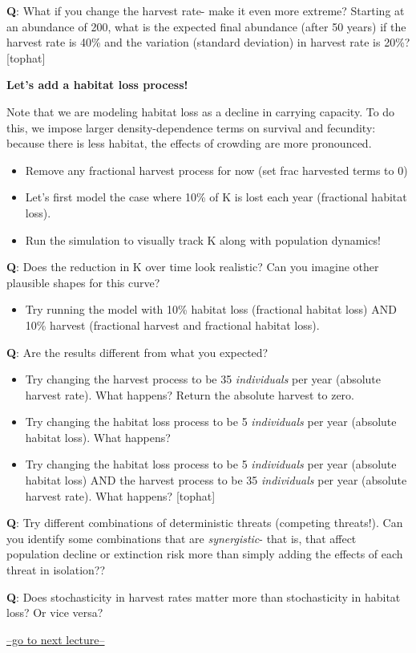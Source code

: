 \documentclass[
]{article}
\providecommand{\tightlist}{%
  \setlength{\itemsep}{0pt}\setlength{\parskip}{0pt}}
\begin{document}
\textbf{Q}: What if you change the harvest rate- make it even more
extreme? Starting at an abundance of 200, what is the expected final
abundance (after 50 years) if the harvest rate is 40\% and the variation
(standard deviation) in harvest rate is 20\%? {[}tophat{]}

\textbf{Let's add a habitat loss process!}

Note that we are modeling habitat loss as a decline in carrying
capacity. To do this, we impose larger density-dependence terms on
survival and fecundity: because there is less habitat, the effects of
crowding are more pronounced.

\begin{itemize}
\item
  Remove any fractional harvest process for now (set frac harvested
  terms to 0)
\item
  Let's first model the case where 10\% of K is lost each year
  (fractional habitat loss).
\item
  Run the simulation to visually track K along with population dynamics!
\end{itemize}

\textbf{Q}: Does the reduction in K over time look realistic? Can you
imagine other plausible shapes for this curve?

\begin{itemize}
\tightlist
\item
  Try running the model with 10\% habitat loss (fractional habitat loss)
  AND 10\% harvest (fractional harvest and fractional habitat loss).
\end{itemize}

\textbf{Q}: Are the results different from what you expected?

\begin{itemize}
\item
  Try changing the harvest process to be 35 \emph{individuals} per year
  (absolute harvest rate). What happens? Return the absolute harvest to
  zero.
\item
  Try changing the habitat loss process to be 5 \emph{individuals} per
  year (absolute habitat loss). What happens?
\item
  Try changing the habitat loss process to be 5 \emph{individuals} per
  year (absolute habitat loss) AND the harvest process to be 35
  \emph{individuals} per year (absolute harvest rate). What happens?
  {[}tophat{]}
\end{itemize}

\textbf{Q}: Try different combinations of deterministic threats
(competing threats!). Can you identify some combinations that are
\emph{synergistic}- that is, that affect population decline or
extinction risk more than simply adding the effects of each threat in
isolation??

\textbf{Q}: Does stochasticity in harvest rates matter more than
stochasticity in habitat loss? Or vice versa?

\href{LECTURE12.html}{--go to next lecture--}
\end{document}
